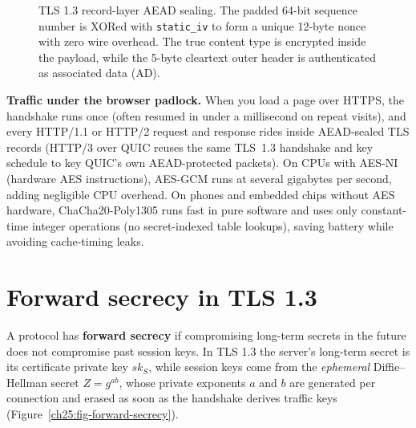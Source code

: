 \begin{figure}[htbp]
\caption{TLS 1.3 record-layer AEAD sealing. The padded 64-bit sequence number is XORed with \texttt{static\_iv} to form a unique 12-byte nonce with zero wire overhead. The true content type is encrypted inside the payload, while the 5-byte cleartext outer header is authenticated as associated data ($\mathrm{AD}$).}
\label{ch25:fig-aead-record}
\end{figure}

\begin{applicationbox}
\textbf{Traffic under the browser padlock.} When you load a page over HTTPS, the
handshake runs once (often resumed in under a millisecond on repeat visits), and
every HTTP/1.1 or HTTP/2 request and response rides inside AEAD-sealed TLS records
(HTTP/3 over QUIC reuses the same TLS~1.3 handshake and key schedule to key QUIC's
own AEAD-protected packets). On CPUs with AES-NI (hardware AES instructions),
AES-GCM runs at several gigabytes per second, adding negligible CPU overhead. On
phones and embedded chips without AES hardware, ChaCha20-Poly1305 runs fast in pure
software and uses only constant-time integer operations (no secret-indexed table
lookups), saving battery while avoiding cache-timing leaks.
\end{applicationbox}

\section{Forward secrecy in TLS 1.3}

A protocol has \textbf{forward secrecy} if compromising long-term secrets in the
future does not compromise past session keys. In TLS 1.3 the server's long-term
secret is its certificate private key $sk_S$, while session keys come from the
\emph{ephemeral} Diffie--Hellman secret $Z = g^{ab}$, whose private exponents $a$
and $b$ are generated per connection and erased as soon as the handshake derives
traffic keys (Figure~\ref{ch25:fig-forward-secrecy}).

